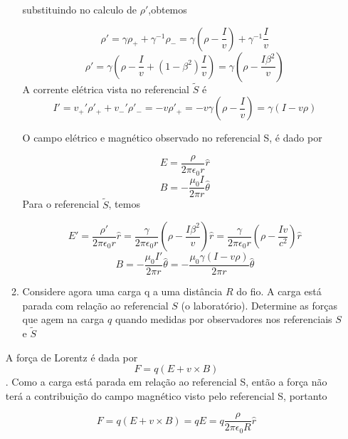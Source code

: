 \documentclass[10pt,a4paper]{article}
\begin{document}
\begin{enumerate}
\begin{enumerate}
		substituindo no calculo de $\rho\prime$,obtemos
		
		\begin{equation*}
			\rho\prime = \gamma\rho_+ + \gamma^{-1}\rho_- = \gamma (\rho -\dfrac{I}{v} ) + \gamma^{-1}\dfrac{I}{v}
		\end{equation*}
		$$ \rho\prime = \gamma \left(\rho - \dfrac{I}{v} + (1 - \beta^2)\dfrac{I}{v}\right) = \gamma \left(\rho 
		-\dfrac{I\beta^2}{v}\right)$$
		A corrente elétrica vista no referencial $\tilde{S}$ é
		\begin{equation*}
			I\prime = v_+\prime \rho\prime_+ + v_- \prime \rho\prime_- = - v \rho\prime_+ = - v \gamma (\rho - \dfrac{I}{v}) = \gamma (I - v\rho)
		\end{equation*}
		
		O campo elétrico e magnético observado no referencial S, é dado por
		
		\begin{equation*}
			E = \dfrac{\rho}{2\pi\epsilon_0 r} \hat{r}
		\end{equation*}
		\begin{equation*}
			B = - \dfrac{\mu_0 I}{2\pi r} \hat{\theta}
		\end{equation*}
		Para o referencial $\tilde{S}$, temos
		
		\begin{equation*}
			E\prime = \dfrac{\rho\prime}{2\pi\epsilon_0 r} \hat{r} = \dfrac{\gamma}{2\pi\epsilon_0 r} \left(\rho 
			-\dfrac{I\beta^2}{v}\right) \hat{r} = \dfrac{\gamma}{2\pi\epsilon_0 r} \left(\rho 
			-\dfrac{Iv}{c^2}\right) \hat{r}
		\end{equation*}
		\begin{equation*}
			B = - \dfrac{\mu_0 I\prime}{2\pi r} \hat{\theta} = - \dfrac{\mu_0 \gamma (I - v\rho)}{2\pi r} \hat{\theta}
		\end{equation*}
		
		\item Considere agora uma carga q a uma distância $R$ do fio. A carga está parada com relação ao referencial $S$ (o laboratório). Determine as forças que agem na carga $q$ quando medidas por observadores nos referenciais $S$ e $\tilde{S}$
	\end{enumerate}
	
	A força de Lorentz é dada por
	$$F = q (E + v\times B)$$. Como a carga está parada em relação ao referencial S, então a força não terá a contribuição do campo magnético visto pelo referencial S, portanto
	
	\begin{equation*}
		F = q (E + v\times B) = q E = q  \dfrac{\rho}{2\pi\epsilon_0 R} \hat{r}
	\end{equation*}
	

\end{enumerate}
\end{document}

